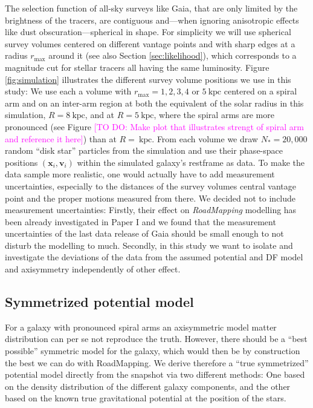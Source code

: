 \documentclass[iop,revtex4,numberedappendix,appendixfloats]{emulateapj}
\newcommand{\vect}[1]{\boldsymbol{#1}}
\newcommand{\RM}{{\sl RoadMapping}}
\newcommand{\Wilma}[1]{\textcolor{Magenta}{#1}}
\begin{document}
The selection function of all-sky surveys like Gaia, that are only limited by the brightness of the tracers, are contiguous and---when ignoring anisotropic effects like dust obscuration---spherical in shape. For simplicity we will use spherical survey volumes centered on different vantage points and with sharp edges at a radius $r_\text{max}$ around it (see also Section \ref{sec:likelihood}), which corresponds to a magnitude cut for stellar tracers all having the same luminosity. Figure \ref{fig:simulation} illustrates the different survey volume positions we use in this study: We use each a volume with $r_\text{max}=1,2,3,4$ or $5~\text{kpc}$ centered on a spiral arm and on an inter-arm region at both the equivalent of the solar radius in this simulation, $R=8~\text{kpc}$, and at $R=5~\text{kpc}$, where the spiral arms are more pronounced (see Figure \Wilma{[TO DO: Make plot that illustrates strengt of spiral arm and reference it here]}) than at $R=~\text{kpc}$. From each volume we draw $N_*=20,000$ random ``disk star'' particles from the simulation and use their phase-space positions $(\vect{x}_i,\vect{v}_i)$ within the simulated galaxy's restframe as data. To make the data sample more realistic, one would actually have to add measurement uncertainties, especially to the distances of the survey volumes central vantage point and the proper motions measured from there. We decided not to include measurement uncertainties: Firstly, their effect on \RM{} modelling has been already investigated in Paper I and we found that the measurement uncertainties of the last data release of Gaia should be small enough to not disturb the modelling to much. Secondly, in this study we want to isolate and investigate the deviations of the data from the assumed potential and DF model and axisymmetry independently of other effect.

\subsection{Symmetrized potential model}

For a galaxy with pronounced spiral arms an axisymmetric model matter distribution can per se not reproduce the truth. However, there should be a ``best possible'' symmetric model for the galaxy, which would then be by construction the best we can do with RoadMapping. We derive therefore a ``true symmetrized'' potential model directly from the snapshot via two different methods: One based on the density distribution of the different galaxy components, and the other based on the known true gravitational potential at the position of the stars. 
\end{document}
